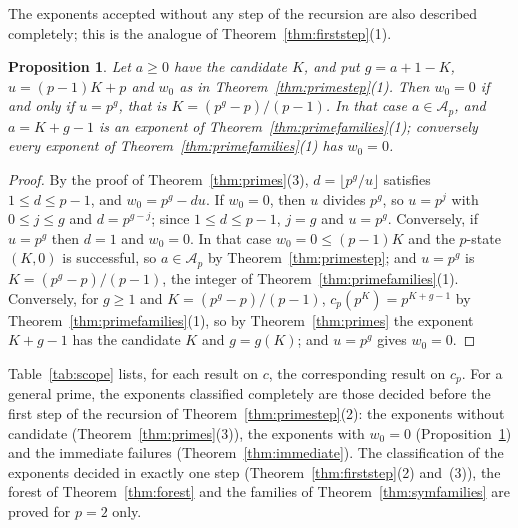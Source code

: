 \documentclass[11pt]{amsart}
\newtheorem{Proposition}[Theorem]{Proposition}
\theoremstyle{definition}
\begin{document}
The exponents accepted without any step of the recursion are also described completely; this is the analogue of Theorem~\ref{thm:firststep}(1).

\begin{Proposition}
\label{prop:primezero}
Let $a\ge0$ have the candidate $K$, and put $g=a+1-K$, $u=(p-1)K+p$ and $w_0$ as in Theorem~\ref{thm:primestep}(1). Then $w_0=0$ if and only if $u=p^g$, that is $K=(p^g-p)/(p-1)$. In that case $a\in\mathcal{A}_p$, and $a=K+g-1$ is an exponent of Theorem~\ref{thm:primefamilies}(1); conversely every exponent of Theorem~\ref{thm:primefamilies}(1) has $w_0=0$.
\end{Proposition}
\begin{proof}
By the proof of Theorem~\ref{thm:primes}(3), $d=\lfloor p^g/u\rfloor$ satisfies $1\le d\le p-1$, and $w_0=p^g-du$. If $w_0=0$, then $u$ divides $p^g$, so $u=p^j$ with $0\le j\le g$ and $d=p^{g-j}$; since $1\le d\le p-1$, $j=g$ and $u=p^g$. Conversely, if $u=p^g$ then $d=1$ and $w_0=0$. In that case $w_0=0\le(p-1)K$ and the $p$-state $(K,0)$ is successful, so $a\in\mathcal{A}_p$ by Theorem~\ref{thm:primestep}; and $u=p^g$ is $K=(p^g-p)/(p-1)$, the integer of Theorem~\ref{thm:primefamilies}(1). Conversely, for $g\ge1$ and $K=(p^g-p)/(p-1)$, $c_p(p^K)=p^{K+g-1}$ by Theorem~\ref{thm:primefamilies}(1), so by Theorem~\ref{thm:primes} the exponent $K+g-1$ has the candidate $K$ and $g=g(K)$; and $u=p^g$ gives $w_0=0$.
\end{proof}

Table~\ref{tab:scope} lists, for each result on $c$, the corresponding result on $c_p$. For a general prime, the exponents classified completely are those decided before the first step of the recursion of Theorem~\ref{thm:primestep}(2): the exponents without candidate (Theorem~\ref{thm:primes}(3)), the exponents with $w_0=0$ (Proposition~\ref{prop:primezero}) and the immediate failures (Theorem~\ref{thm:immediate}). The classification of the exponents decided in exactly one step (Theorem~\ref{thm:firststep}(2) and~(3)), the forest of Theorem~\ref{thm:forest} and the families of Theorem~\ref{thm:symfamilies} are proved for $p=2$ only.
\end{document}
